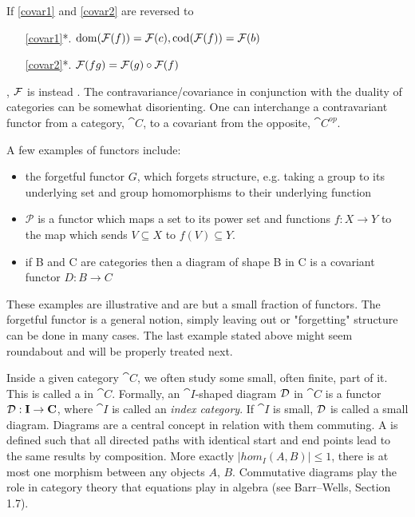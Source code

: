 \documentclass[../../main.tex]{subfiles}
\begin{document}
    If \ref{covar1} and \ref{covar2} are reversed to
    
    \begin{enumerate}
        \item [\ref{covar1}*.] $\mathrm{dom}(\mathcal{F}(f)) = \mathcal{F}(c), \mathrm{cod}(\mathcal{F}(f)) = \mathcal{F}(b)$ \label{cov1}
        \item [\ref{covar2}*.] $\mathcal{F}(fg) = \mathcal{F}(g) \circ \mathcal{F}(f)$ \label{cov2}
    \end{enumerate}

    , $\mathcal{F}$ is instead . The contravariance/covariance in conjunction with the duality of categories can be somewhat disorienting. One can interchange a contravariant functor from a category, $\cat{C}$, to a covariant from the opposite, $\cat{C^{op}}$.

    \begin{example}\label{functor_exmp}
        A few examples of functors include:
        \begin{itemize}
            \item the forgetful functor $G$, which forgets structure, e.g. taking a group to its underlying set and group homomorphisms to their underlying function
            \item $\mathcal{P}$ is a functor which maps a set to its power set and functions $f:X\to Y$ to the map which sends $V\subseteq X $ to $f(V)\subseteq Y$. 
            \item if B and C are categories then a diagram of shape B in C is a covariant functor $D:B\to C$
        \end{itemize}
    \end{example}

    These examples are illustrative and are but a small fraction of functors. The forgetful functor is a general notion, simply leaving out or "forgetting" structure can be done in many cases. The last example stated above might seem roundabout and will be properly treated next. 
    
    Inside a given category $\cat{C}$, we often study some small, often finite, part of it. This is called a  in $\cat{C}$. Formally, an $\cat{I}$-shaped diagram $\mathcal{D}$ in $\cat{C}$ is a functor $\mathcal{D}: \mathbf{I} \to \mathbf{C}$, where $\cat{I}$ is called an \emph{index category}. If $\cat{I}$ is small, $\mathcal{D}$ is called a small diagram. Diagrams are a central concept in relation with them commuting. A  is defined such that all directed paths with identical start and end points lead to the same results by composition. More exactly $|hom_I(A,B)|\leq 1$, there is at most one morphism between any objects $A,\,B$. Commutative diagrams play the role in category theory that equations play in algebra (see Barr–Wells, Section 1.7).%
    
\end{document}
